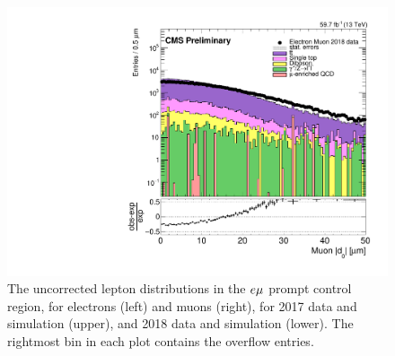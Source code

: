 \begin{figure}[hbtp]
\includegraphics[scale=0.3]{figures/corrections/d0_smearing/emu_2018/muonAbsD0_50um_uncorrected.pdf}
\caption{The uncorrected lepton \ad distributions in the $e{\mu}$ prompt control region, for electrons (left) and muons (right), for 2017 data and simulation (upper), and 2018 data and simulation (lower). The rightmost bin in each plot
contains the overflow entries.}
\label{uncorrected_d0}
\end{figure}

